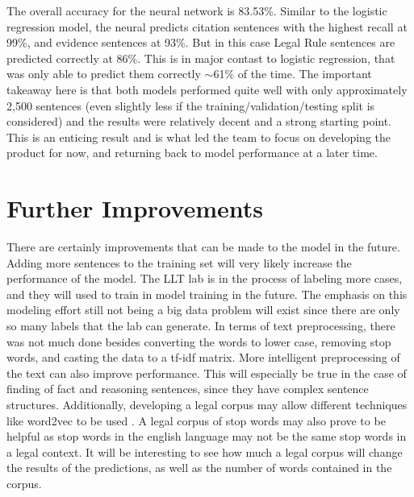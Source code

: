 \documentclass[11pt]{article}
\begin{document}
The overall accuracy for the neural network is 83.53\%. Similar to the logistic regression model, the neural predicts citation sentences with the highest recall at 99\%, and evidence sentences at 93\%. But in this case Legal Rule sentences are predicted correctly at 86\%. This is in major contast to logistic regression, that was only able to predict them correctly $\sim$61\% of the time. The important takeaway here is that both models performed quite well with only approximately 2,500 sentences (even slightly less if the training/validation/testing split is considered) and the results were relatively decent and a strong starting point. This is an enticing result and is what led the team to focus on developing the product for now, and returning back to model performance at a later time.

\section*{Further Improvements}

There are certainly improvements that can be made to the model in the future. Adding more sentences to the training set will very likely increase the performance of the model. The LLT lab is in the process of labeling more cases, and they will used to train in model training in the future. The emphasis on this modeling effort still not being a big data problem will exist since there are only so many labels that the lab can generate. In terms of text preprocessing, there was not much done besides converting the words to lower case, removing stop words, and casting the data to a tf-idf matrix. More intelligent preprocessing of the text can also improve performance. This will especially be true in the case of finding of fact and reasoning sentences, since they have complex sentence structures. Additionally, developing a legal corpus may allow different techniques like word2vec to be used \cite{word2vec}. A legal corpus of stop words may also prove to be helpful as stop words in the english language may not be the same stop words in a legal context. It will be interesting to see how much a legal corpus will change the results of the predictions, as well as the number of words contained in the corpus.


\newpage


\end{document}
